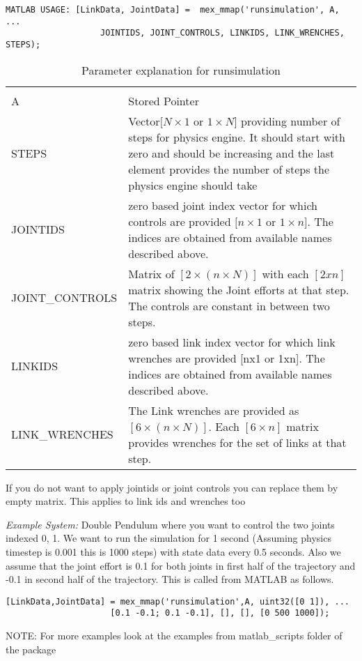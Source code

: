 \documentclass[letterpaper,10pt]{article}
\begin{document}
\begin{itemize}
\begin{Verbatim}[frame=single]
    MATLAB USAGE: [LinkData, JointData] =  mex_mmap('runsimulation', A,  ...
                   JOINTIDS, JOINT_CONTROLS, LINKIDS, LINK_WRENCHES, STEPS);
\end{Verbatim}
    \begin{table}[h!]
    \begin{tabular}{|p{}|p{}|}
      \hline\\
      A & Stored Pointer \\ \hline
      STEPS& Vector$[N\times 1$ or $1\times N]$  providing number of steps for physics engine. It should start with zero and should be increasing and the last element provides the number of steps the physics engine should take\\ \hline
      JOINTIDS & zero based joint index vector for which controls are provided $[n\times 1$ or $1\times n]$. The indices are obtained from available names described above.\\ \hline
      JOINT\_CONTROLS & Matrix of $[2\times (n\times N)]$ with each $[2xn]$ matrix showing the Joint efforts at that step. The controls are constant in between two steps.\\ \hline %
      LINKIDS &  zero based link index vector for which link wrenches are provided [nx1 or 1xn]. The indices are obtained from available names described above.\\ \hline
      LINK\_WRENCHES & The Link wrenches are provided as $[6 \times (n \times N)]$. Each $[6\times n]$ matrix provides wrenches for the set of links at that step.\\
      \hline
    \end{tabular}
    \caption{Parameter explanation for runsimulation}
    \end{table}
    If you do not want to apply jointids or joint controls you can replace them by empty matrix. This applies to link ids and wrenches too
    
    \textit{Example System:} Double Pendulum where you want to control the two joints indexed 0, 1. We want to run the simulation for 1 second   
    (Assuming physics timestep is 0.001 this is 1000 steps) with state data every 0.5 seconds. Also we assume that the joint effort is 0.1 for both joints in first half of the trajectory
    and -0.1 in second half of the trajectory. This is called from MATLAB as follows.
    \begin{Verbatim}[frame=single]
    [LinkData,JointData] = mex_mmap('runsimulation',A, uint32([0 1]), ...
			         [0.1 -0.1; 0.1 -0.1], [], [], [0 500 1000]);
    \end{Verbatim}
  NOTE: For more examples look at the examples from matlab\_scripts folder of the package
\end{itemize}
\end{document}
